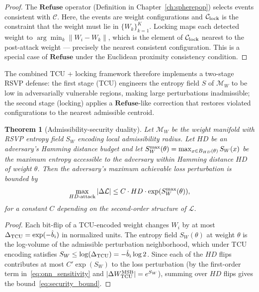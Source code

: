 \documentclass[11pt, openright, twoside]{book}
\theoremstyle{plain}
\newtheorem{theorem}{Theorem}[chapter]
\theoremstyle{definition}
\theoremstyle{remark}
\newcommand{\Sfield}{S}
\newcommand{\Refuse}{\mathbf{Refuse}}
\begin{document}
\begin{proof}
The $\Refuse$ operator (Definition in Chapter~\ref{ch:spherepop}) selects events
consistent with $\mathcal{C}$. Here, the events are weight configurations and
$\mathcal{C}_{\rm lock}$ is the constraint that the weight must lie in $\{W_k\}_{k=1}^K$.
Locking maps each detected weight to $\arg\min_k \|W_i - W_k\|$, which is the element
of $\mathcal{C}_{\rm lock}$ nearest to the post-attack weight --- precisely the nearest
consistent configuration. This is a special case of $\Refuse$ under the Euclidean
proximity consistency condition.
\end{proof}

The combined TCU + locking framework therefore implements a two-stage RSVP defense:
the first stage (TCU) engineers the entropy field $\Sfield$ of $\mathcal{M}_W$ to be
low in adversarially vulnerable regions, making large perturbations inadmissible;
the second stage (locking) applies a $\Refuse$-like correction that restores violated
configurations to the nearest admissible centroid.

\begin{theorem}[Admissibility-security duality]
\label{thm:security_duality}
Let $\mathcal{M}_W$ be the weight manifold with RSVP entropy field $\Sfield_W$ encoding
local admissibility radius. Let $HD$ be an adversary's Hamming distance budget and let
$\Sfield_W^{\rm max}(\theta) = \max_{x\in B_{HD}(\theta)}\Sfield_W(x)$ be the maximum
entropy accessible to the adversary within Hamming distance $HD$ of weight $\theta$.
Then the adversary's maximum achievable loss perturbation is bounded by
\begin{equation}
  \max_{HD\text{-attack}} |\Delta\mathcal{L}|
  \leq C \cdot HD \cdot \exp(\Sfield_W^{\rm max}(\theta)),
  \label{eq:security_bound}
\end{equation}
for a constant $C$ depending on the second-order structure of $\mathcal{L}$.
\end{theorem}

\begin{proof}
Each bit-flip of a TCU-encoded weight changes $W_i$ by at most $\Delta_{\rm TCU} =
\exp(-\hat b_i)$ in normalized units. The entropy field $\Sfield_W(\theta)$ at weight
$\theta$ is the log-volume of the admissible perturbation neighborhood, which under
TCU encoding satisfies $\Sfield_W \leq \log(\Delta_{\rm TCU}) = -\hat b_i \log 2$.
Since each of the $HD$ flips contributes at most $C'\exp(\Sfield_W)$ to the loss
perturbation (by the first-order term in~\eqref{eq:onn_sensitivity} and
$|\Delta W^{\rm MSB}_{\rm TCU}| = e^{\Sfield_W}$), summing over $HD$ flips gives
the bound~\eqref{eq:security_bound}.
\end{proof}
\end{document}
